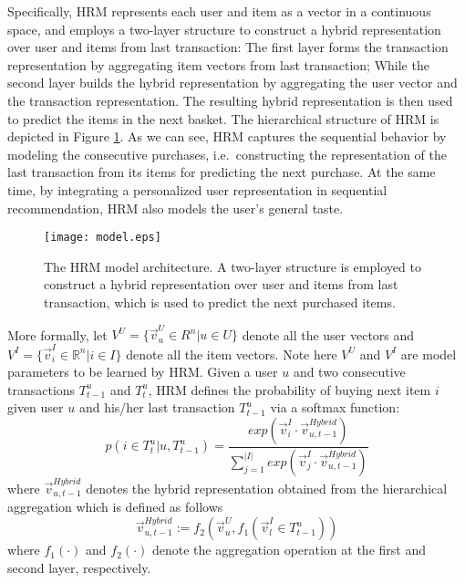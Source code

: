 \documentclass[10pt,journal,compsoc]{IEEEtran}
\begin{document}
Specifically, HRM represents each user and item as a vector in a continuous space, and employs a two-layer structure to construct a hybrid representation over user and items from last transaction: The first layer forms the transaction representation by aggregating item vectors from last transaction; While the second layer builds the hybrid representation by aggregating the user vector and the transaction representation. The resulting hybrid representation is then used to predict the items in the next basket. The hierarchical structure of HRM is depicted in Figure \ref{fig:hrm}. As we can see, HRM captures the sequential behavior by modeling the consecutive purchases, i.e.~constructing the representation of the last transaction from its items for predicting the next purchase. At the same time, by integrating a personalized user representation in sequential recommendation, HRM also models the user's general taste.

\begin{figure}[t]
\centering
\texttt{[image: model.eps]}
\caption{\label{fig:hrm}The HRM model architecture. A two-layer structure is employed to construct a hybrid representation over user and items from last transaction, which is used to predict the next purchased items.}
\end{figure}

More formally, let $V^U=\{\vec{v}^U_u\in {R}^n|u\in U\}$ denote all the user vectors and $V^I=\{\vec{v}^I_i\in \mathbb{R}^n|i\in I\}$ denote all the item vectors. Note here $V^U$ and $V^I$ are model parameters to be learned by HRM. Given a user $u$ and two consecutive transactions $T^u_{t-1}$ and $T^u_t$, HRM defines the probability of buying next item $i$ given user $u$ and his/her last transaction $T^u_{t-1}$ via a softmax function:
%
\begin{equation}
    \label{eq:softmax}
  p(i\in T^u_t|u,T^u_{t-1})=\frac{exp(\vec{v}^I_i\cdot\vec{v}^{Hybrid}_{u,t-1})}{\sum_{j=1}^{|I|}exp(\vec{v}^I_j\cdot\vec{v}^{Hybrid}_{u,t-1})}
\end{equation}
where $\vec{v}^{Hybrid}_{u,t-1}$ denotes the hybrid representation obtained from the hierarchical aggregation which is defined as follows
\begin{displaymath}
\vec{v}^{Hybrid}_{u,t-1}:=f_2(\vec{v}^U_u,f_1(\vec{v}^I_{l}\in T^u_{t-1}))
\end{displaymath}
where $f_1(\cdot)$ and $f_2(\cdot)$ denote the aggregation operation at the first and second layer, respectively.
\end{document}
